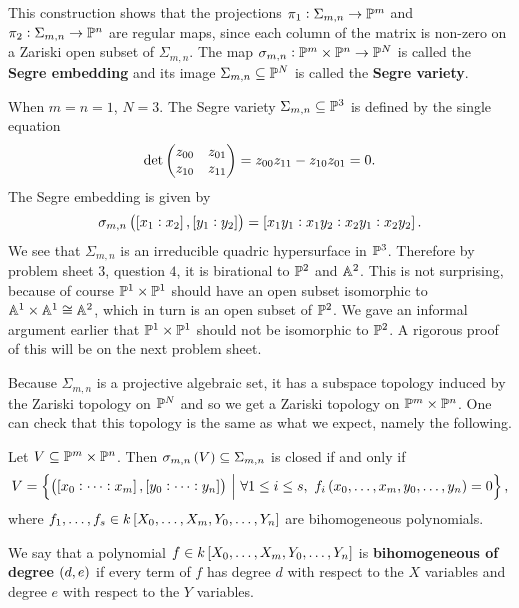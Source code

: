 This construction shows that the projections $ \pi_1 : \Sigma_{m, n} \to \PP^m $ and $ \pi_2 : \Sigma_{m, n} \to \PP^n $ are regular maps, since each column of the matrix is non-zero on a Zariski open subset of $ \Sigma_{m, n} $. The map $ \sigma_{m, n} : \PP^m \times \PP^n \to \PP^N $ is called the \textbf{Segre embedding} and its image $ \Sigma_{m, n} \subseteq \PP^N $ is called the \textbf{Segre variety}.


\begin{example*}
When $ m = n = 1 $, $ N = 3 $. The Segre variety $ \Sigma_{m, n} \subseteq \PP^3 $ is defined by the single equation
$$ \det \twobytwo{z_{00}}{z_{01}}{z_{10}}{z_{11}} = z_{00}z_{11} - z_{10}z_{01} = 0. $$
The Segre embedding is given by
$$ \sigma_{m, n}\br{\sbr{x_1 : x_2}, \sbr{y_1 : y_2}} = \sbr{x_1y_1 : x_1y_2 : x_2y_1 : x_2y_2}. $$
We see that $ \Sigma_{m, n} $ is an irreducible quadric hypersurface in $ \PP^3 $. Therefore by problem sheet $ 3 $, question $ 4 $, it is birational to $ \PP^2 $ and $ \AA^2 $. This is not surprising, because of course $ \PP^1 \times \PP^1 $ should have an open subset isomorphic to $ \AA^1 \times \AA^1 \cong \AA^2 $, which in turn is an open subset of $ \PP^2 $. We gave an informal argument earlier that $ \PP^1 \times \PP^1 $ should not be isomorphic to $ \PP^2 $. A rigorous proof of this will be on the next problem sheet.
\end{example*}

\pagebreak

Because $ \Sigma_{m, n} $ is a projective algebraic set, it has a subspace topology induced by the Zariski topology on $ \PP^N $ and so we get a Zariski topology on $ \PP^m \times \PP^n $. One can check that this topology is the same as what we expect, namely the following.

\begin{lemma}
Let $ V \subseteq \PP^m \times \PP^n $. Then $ \sigma_{m, n}\br{V} \subseteq \Sigma_{m, n} $ is closed if and only if
$$ V = \cbr{\br{\sbr{x_0 : \dots : x_m}, \sbr{y_0 : \dots : y_n}} \st \forall 1 \le i \le s, \ f_i\br{x_0, \dots, x_m, y_0, \dots, y_n} = 0}, $$
where $ f_1, \dots, f_s \in k\sbr{X_0, \dots, X_m, Y_0, \dots, Y_n} $ are bihomogeneous polynomials.
\end{lemma}

We say that a polynomial $ f \in k\sbr{X_0, \dots, X_m, Y_0, \dots, Y_n} $ is \textbf{bihomogeneous of degree $ \br{d, e} $} if every term of $ f $ has degree $ d $ with respect to the $ X $ variables and degree $ e $ with respect to the $ Y $ variables.

